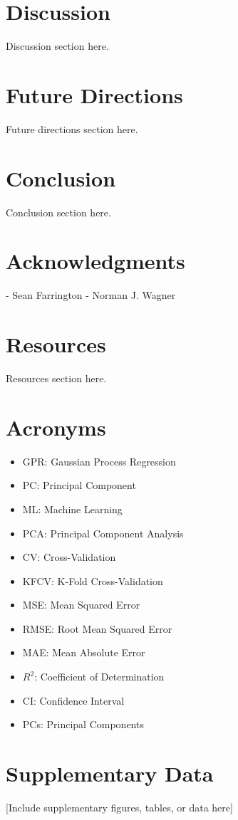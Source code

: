 \documentclass[12pt,letterpaper]{article}
\begin{document}
\newpage
\section{Discussion}
Discussion section here.



\newpage
\section{Future Directions}
Future directions section here.

\newpage
\section{Conclusion}
Conclusion section here.

\newpage
\section{Acknowledgments}

- Sean Farrington
- Norman J. Wagner

\newpage
\section{Resources}
Resources section here.

\newpage
\section{Acronyms}
\begin{itemize}
    \item GPR: Gaussian Process Regression
    \item PC: Principal Component
    \item ML: Machine Learning
    \item PCA: Principal Component Analysis
    \item CV: Cross-Validation
    \item KFCV: K-Fold Cross-Validation
    \item MSE: Mean Squared Error
    \item RMSE: Root Mean Squared Error
    \item MAE: Mean Absolute Error
    \item $R^2$: Coefficient of Determination
    \item CI: Confidence Interval
    \item PCs: Principal Components
\end{itemize}

\newpage

\newpage
\appendix

\section{Supplementary Data}
\label{app:supplementary}

[Include supplementary figures, tables, or data here]
\end{document}
